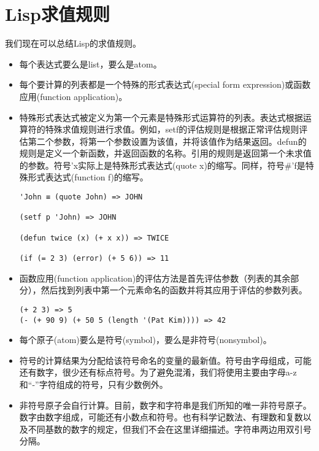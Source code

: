\section{Lisp求值规则}
我们现在可以总结Lisp的求值规则。

\begin{itemize}
	\item 每个表达式要么是list，要么是atom。
	\item 每个要计算的列表都是一个特殊的形式表达式(special form expression)或函数应用(function application)。
	\item 特殊形式表达式被定义为第一个元素是特殊形式运算符的列表。表达式根据运算符的特殊求值规则进行求值。例如，setf的评估规则是根据正常评估规则评估第二个参数，将第一个参数设置为该值，并将该值作为结果返回。defun的规则是定义一个新函数，并返回函数的名称。引用的规则是返回第一个未求值的参数。符号'x实际上是特殊形式表达式(quote x)的缩写。同样，符号\#'f是特殊形式表达式(function f)的缩写。
	\begin{lstlisting}[frame=shadowbox]
'John ≡ (quote John) => JOHN
				
(setf p 'John) => JOHN
		
(defun twice (x) (+ x x)) => TWICE
		
(if (= 2 3) (error) (+ 5 6)) => 11
	\end{lstlisting}
	\item 函数应用(function application)的评估方法是首先评估参数（列表的其余部分），然后找到列表中第一个元素命名的函数并将其应用于评估的参数列表。
	\begin{lstlisting}[frame=shadowbox]
(+ 2 3) => 5
(- (+ 90 9) (+ 50 5 (length '(Pat Kim)))) => 42
	\end{lstlisting}
	\item 每个原子(atom)要么是符号(symbol)，要么是非符号(nonsymbol)。
	\item 符号的计算结果为分配给该符号命名的变量的最新值。符号由字母组成，可能还有数字，很少还有标点符号。为了避免混淆，我们将使用主要由字母a-z和“-”字符组成的符号，只有少数例外。
	\item 非符号原子会自行计算。目前，数字和字符串是我们所知的唯一非符号原子。数字由数字组成，可能还有小数点和符号。也有科学记数法、有理数和复数以及不同基数的数字的规定，但我们不会在这里详细描述。字符串两边用双引号分隔。
\end{itemize}